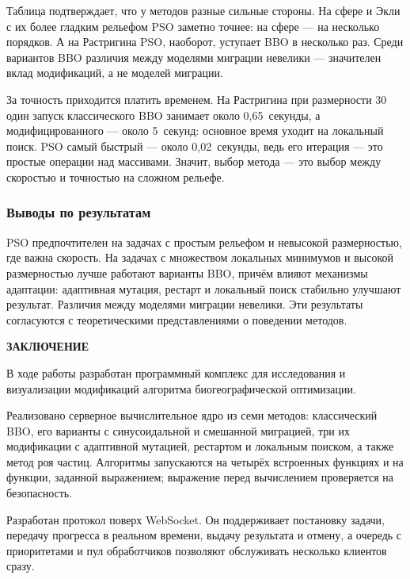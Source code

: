 \documentclass[14pt, a4paper]{extarticle}
\newcommand{\structelem}[1]{%
  \clearpage
  \phantomsection
  \addcontentsline{toc}{section}{#1}%
  \begin{center}\large\bfseries #1\end{center}
  \vspace{8pt}}
\begin{document}
Таблица подтверждает, что у методов разные сильные стороны. На сфере и Экли с их
более гладким рельефом PSO заметно точнее: на сфере --- на несколько порядков. А на
Растригина PSO, наоборот, уступает BBO в несколько раз. Среди
вариантов BBO различия между моделями миграции невелики --- значителен вклад модификаций, а не моделей миграции.

За точность приходится платить временем. На Растригина при размерности 30 один
запуск классического BBO занимает около 0,65~секунды, а модифицированного --- около
5~секунд: основное время уходит на локальный поиск. PSO самый быстрый --- около
0,02~секунды, ведь его итерация --- это простые операции над массивами. Значит,
выбор метода --- это выбор между скоростью и точностью на сложном рельефе.

\subsubsection{Выводы по результатам}

PSO предпочтителен на задачах с простым
рельефом и невысокой размерностью, где важна скорость. На задачах с множеством
локальных минимумов и высокой размерностью лучше работают варианты BBO, причём
влияют механизмы адаптации: адаптивная мутация, рестарт и локальный поиск стабильно
улучшают результат. Различия между моделями миграции невелики. Эти результаты
согласуются с теоретическими представлениями о поведении методов.

\structelem{ЗАКЛЮЧЕНИЕ}

В ходе работы разработан программный комплекс для исследования и визуализации
модификаций алгоритма биогеографической оптимизации. 

Реализовано серверное вычислительное ядро из семи методов: классический BBO, его
варианты с синусоидальной и смешанной миграцией, три их модификации с адаптивной
мутацией, рестартом и локальным поиском, а также метод роя частиц. Алгоритмы
запускаются на четырёх встроенных функциях и на функции, заданной выражением;
выражение перед вычислением проверяется на безопасность.

Разработан протокол поверх WebSocket. Он поддерживает
постановку задачи, передачу прогресса в реальном времени, выдачу результата и
отмену, а очередь с приоритетами и пул обработчиков позволяют обслуживать несколько
клиентов сразу.
\end{document}

